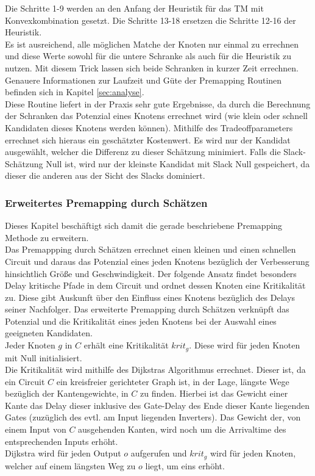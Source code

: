 \documentclass[11pt, a4paper, german]{article}
\begin{document}
Die Schritte 1-9 werden an den Anfang der Heuristik für das TM mit Konvexkombination gesetzt. Die Schritte 13-18 ersetzen die Schritte 12-16 der Heuristik.\\ 
Es ist ausreichend, alle möglichen Matche der Knoten nur einmal zu errechnen und diese Werte sowohl für die untere Schranke als auch für die Heuristik zu nutzen. Mit diesem Trick lassen sich beide Schranken in kurzer Zeit errechnen. Genauere Informationen zur Laufzeit und Güte der Premapping Routinen befinden sich in Kapitel \ref{sec:analyse}.\\
Diese Routine liefert in der Praxis sehr gute Ergebnisse, da durch die Berechnung der Schranken das Potenzial eines Knotens errechnet wird (wie klein oder schnell Kandidaten dieses Knotens werden können). Mithilfe des Tradeoffparameters errechnet sich hieraus ein geschätzter Kostenwert. Es wird nur der Kandidat ausgewählt, welcher die Differenz zu dieser Schätzung minimiert. Falls die Slack-Schätzung Null ist, wird nur der kleinste Kandidat mit Slack Null gespeichert, da dieser die anderen aus der Sicht des Slacks dominiert.

\subsubsection{Erweitertes Premapping durch Schätzen}
\label{subsec:erweitertes_premapping_durch_schaetzen}
Dieses Kapitel beschäftigt sich damit die gerade beschriebene Premapping Methode zu erweitern. \\
Das Premappping durch Schätzen errechnet einen kleinen und einen schnellen Circuit und daraus das Potenzial eines jeden Knotens bezüglich der Verbesserung hinsichtlich Größe und Geschwindigkeit. Der folgende Ansatz findet besonders Delay kritische Pfade in dem Circuit und ordnet dessen Knoten eine Kritikalität zu. Diese gibt Auskunft über den Einfluss eines Knotens bezüglich des Delays seiner Nachfolger. Das erweiterte Premapping durch Schätzen verknüpft das Potenzial und die Kritikalität eines jeden Knotens bei der Auswahl eines geeigneten Kandidaten. \\

Jeder Knoten $g$ in $C$ erhält eine Kritikalität $krit_g$. Diese wird für jeden Knoten mit Null initialisiert. \\
Die Kritikalität wird mithilfe des Dijkstras Algorithmus errechnet. Dieser ist, da ein Circuit $C$ ein kreisfreier gerichteter Graph ist, in der Lage, längste Wege bezüglich der Kantengewichte,  in $C$ zu finden. Hierbei ist das Gewicht einer Kante das Delay dieser inklusive des Gate-Delay des Ende dieser Kante liegenden Gates (zuzüglich des evtl. am Input liegenden Inverters). Das Gewicht der, von einem Input von $C$ ausgehenden Kanten, wird noch um die Arrivaltime des entsprechenden Inputs erhöht. \\
Dijkstra wird für jeden Output $o$ aufgerufen und $krit_g$ wird für jeden Knoten, welcher auf einem längsten Weg zu $o$ liegt, um eins erhöht.\\
\end{document}
